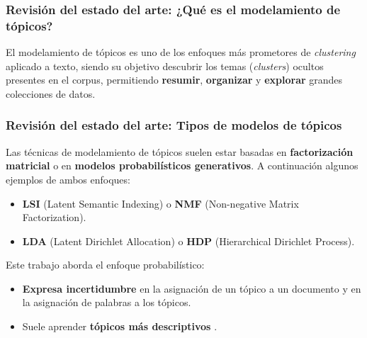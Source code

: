 \documentclass[
	spanish, %
	aspectratio=43, %
	hyperref={pdfencoding=auto,psdextra},
	xcolor={dvipsnames,table,usenames},
]{beamer}
\begin{document}
\begin{frame}[t]
\frametitle{Revisión del estado del arte: ¿Qué es el modelamiento de tópicos?}
  El modelamiento de tópicos es uno de los enfoques más prometores de \textit{clustering} aplicado a texto, siendo su objetivo descubrir los temas (\textit{clusters}) ocultos presentes en el corpus, permitiendo \textbf{resumir}, \textbf{organizar} y \textbf{explorar} grandes colecciones de datos.


\end{frame}

\begin{frame}[t]
\frametitle{Revisión del estado del arte: Tipos de modelos de tópicos}
Las técnicas de modelamiento de tópicos suelen estar basadas en \textbf{factorización matricial} o en \textbf{modelos probabilísticos generativos}. 
\newline\newline
A continuación algunos ejemplos de ambos enfoques:

\begin{itemize}
  \item \textbf{LSI} (Latent Semantic Indexing) \cite{dumais2004latent} o \textbf{NMF} (Non-negative Matrix Factorization)\cite{xu2003document}. 
  \item \textbf{LDA} (Latent Dirichlet Allocation)\cite{blei2003latent} o \textbf{HDP} (Hierarchical Dirichlet Process)\cite{teh2005sharing}. 
\end{itemize} 

Este trabajo aborda el enfoque probabilístico: 
\begin{itemize}
  \item \textbf{Expresa incertidumbre} en la asignación de un tópico a un documento y en la asignación de palabras a los tópicos.%
  \item Suele aprender \textbf{tópicos más descriptivos} \cite{stevens2012exploring}.%
\end{itemize}

\end{frame}
\end{document}
